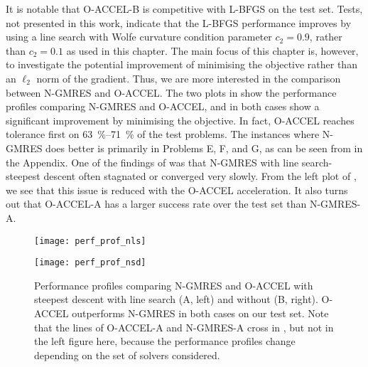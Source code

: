 \documentclass[main.tex]{subfiles}
\begin{document}
It is notable that O-ACCEL-B is competitive with L-BFGS on the test
set. Tests, not presented in this work, indicate that the L-BFGS
performance improves by using a line search with Wolfe curvature
condition parameter $c_2=0.9$, rather than $c_2=0.1$ as used in this
chapter.  The main focus of this chapter is, however, to
investigate the potential improvement of minimising the objective
rather than an $\ell_2$ norm of the gradient. Thus, we are more
interested in the comparison between N-GMRES and O-ACCEL.  The two
plots in  show the performance profiles
comparing N-GMRES and O-ACCEL, and in both cases show a significant
improvement by minimising the objective. In fact, O-ACCEL reaches
tolerance first on \SIrange{63}{71}{\percent} of the test problems.
The instances where N-GMRES does better is primarily in Problems E, F,
and G, as can be seen from  in the Appendix.  One of
the findings of \citet{sterck2013steepest} was that N-GMRES with line
search-steepest descent often stagnated or converged very slowly. From
the left plot of , we see that this issue
is reduced with the O-ACCEL acceleration. It also turns out that
O-ACCEL-A has a larger success rate over the test set than N-GMRES-A.
\begin{figure}[htb]
  \centering
  \begin{minipage}{0.49\textwidth}
    \texttt{[image: perf\_prof\_nls]}
  \end{minipage}
  \hfill
  \begin{minipage}{0.49\textwidth}
    \texttt{[image: perf\_prof\_nsd]}
  \end{minipage}
  \caption{Performance profiles comparing N-GMRES and O-ACCEL with
    steepest descent with line search (A, left) and without (B,
    right).  O-ACCEL outperforms N-GMRES in both cases on our test
    set.  Note that the lines of O-ACCEL-A and N-GMRES-A cross in
    , but not in the left figure here, because
    the performance profiles change depending on the set of solvers
    considered.  }\label{fig:perf_prof_nls_nsd}
\end{figure}
\end{document}
